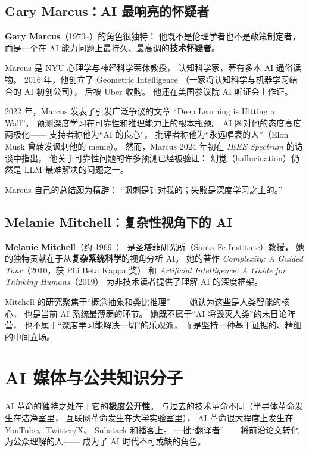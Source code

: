 \subsection{Gary Marcus：AI 最响亮的怀疑者}

\textbf{Gary Marcus}（1970--）的角色很独特：
他既不是伦理学者也不是政策制定者，
而是一个在 AI 能力问题上最持久、最高调的\textbf{技术怀疑者}。

Marcus 是 NYU 心理学与神经科学荣休教授，
认知科学家，著有多本 AI 通俗读物。
2016 年，他创立了 Geometric Intelligence
（一家将认知科学与机器学习结合的 AI 初创公司），
后被 Uber 收购。
他还在美国参议院 AI 听证会上作证。

2022 年，Marcus 发表了引发广泛争议的文章
``Deep Learning is Hitting a Wall''，
预测深度学习在可靠性和推理能力上的根本瓶颈。
AI 圈对他的态度高度两极化——
支持者称他为``AI 的良心''，
批评者称他为``永远唱衰的人''（Elon Musk 曾转发讽刺他的 meme）。
然而，Marcus 2024 年初在 \emph{IEEE Spectrum} 的访谈中指出，
他关于可靠性问题的许多预测已经被验证：
幻觉（hallucination）仍然是 LLM 最难解决的问题之一。

Marcus 自己的总结颇为精辟：
``讽刺是针对我的；失败是深度学习之主的。''

\subsection{Melanie Mitchell：复杂性视角下的 AI}

\textbf{Melanie Mitchell}（约 1969--）
是圣塔菲研究所（Santa Fe Institute）教授，
她的独特贡献在于从\textbf{复杂系统科学}的视角分析 AI。
她的著作 \emph{Complexity: A Guided Tour}（2010，获 Phi Beta Kappa 奖）
和 \emph{Artificial Intelligence: A Guide for Thinking Humans}（2019）
为非技术读者提供了理解 AI 的深度框架。

Mitchell 的研究聚焦于``概念抽象和类比推理''——
她认为这些是人类智能的核心，
也是当前 AI 系统最薄弱的环节。
她既不属于``AI 将毁灭人类''的末日论阵营，
也不属于``深度学习能解决一切''的乐观派，
而是坚持一种基于证据的、精细的中间立场。

\section{AI 媒体与公共知识分子}
\label{sec:media}

AI 革命的独特之处在于它的\textbf{极度公开性}。
与过去的技术革命不同（半导体革命发生在洁净室里，
互联网革命发生在大学实验室里），
AI 革命很大程度上发生在 YouTube、Twitter/X、
Substack 和播客上。
一批``翻译者''——将前沿论文转化为公众理解的人——
成为了 AI 时代不可或缺的角色。

